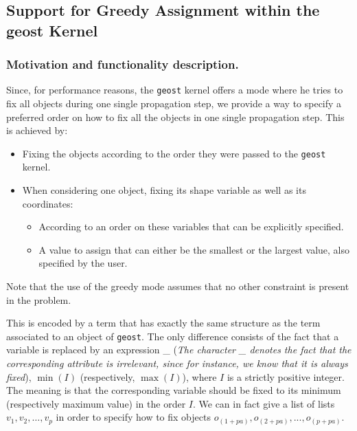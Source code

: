 \subsection{Support for Greedy Assignment within the geost Kernel}\label{geostdescription:supportforgreedyassignmentwithinthegeostkernel}\hypertarget{geostdescription:supportforgreedyassignmentwithinthegeostkernel}{}

\subsubsection{Motivation and functionality description.}\label{geostdescription:motivationandfunctionalitydescription}\hypertarget{geostdescription:motivationandfunctionalitydescription}{}
Since, for performance reasons, the \texttt{geost} kernel offers a mode where he tries to fix all objects during one single propagation step, we provide a way to specify a preferred order on how to fix all the objects in one single propagation step. This is achieved by:
\begin{itemize}
	\item Fixing the objects according to the order they were passed to the \texttt{geost} kernel.
	\item When considering one object, fixing its shape variable as well as its coordinates:
	\begin{itemize}
		\item According to an order on these variables that can be explicitly specified.
		\item A value to assign that can either be the smallest or the largest value, also specified by the user.
	\end{itemize}
\end{itemize}

\begin{note}
Note that the use of the greedy mode assumes that no other constraint is present in the problem.
\end{note}

	This is encoded by a term that has exactly the same structure as the term associated to an object of  \texttt{geost}. The only difference consists of the fact that a variable is replaced by an expression \_ (\emph{The character \_ denotes the fact that the corresponding attribute is irrelevant, since for instance, we know that it is always fixed}), $\min(I)$ (respectively, $\max(I)$), where $I$ is a strictly positive integer. The meaning is that the corresponding variable should be fixed to its minimum (respectively maximum value) in the order $I$.   We can in fact give a list of lists  $v_1,v_2,\ldots,v_p$ in order to specify how to fix objects $o_{(1+pa)},o_{(2+pa)},...,o_{(p+pa)}$.

